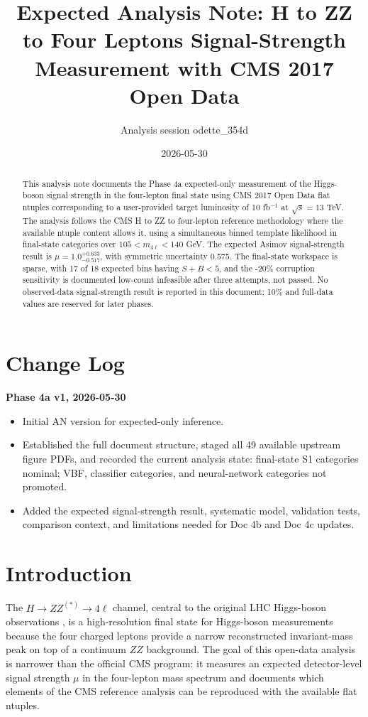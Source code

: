 \documentclass[11pt]{article}
\title{Expected Analysis Note: H to ZZ to Four Leptons Signal-Strength Measurement with CMS 2017 Open Data}
\author{Analysis session odette\_354d}
\date{2026-05-30}
\begin{document}
\maketitle
\begin{abstract}
This analysis note documents the Phase 4a expected-only measurement of the Higgs-boson signal strength in the four-lepton final state using CMS 2017 Open Data flat ntuples corresponding to a user-provided target luminosity of 10 fb$^{-1}$ at $\sqrt{s}=13$ TeV. The analysis follows the CMS H to ZZ to four-lepton reference methodology where the available ntuple content allows it, using a simultaneous binned template likelihood in final-state categories over $105 < m_{4\ell} < 140$ GeV. The expected Asimov signal-strength result is $\mu=1.0^{+0.633}_{-0.517}$, with symmetric uncertainty 0.575. The final-state workspace is sparse, with 17 of 18 expected bins having $S+B<5$, and the -20\% corruption sensitivity is documented low-count infeasible after three attempts, not passed. No observed-data signal-strength result is reported in this document; 10\% and full-data values are reserved for later phases.
\end{abstract}
\tableofcontents
\clearpage
\section*{Change Log}
\textbf{Phase 4a v1, 2026-05-30}
\begin{itemize}[leftmargin=*]
\item Initial AN version for expected-only inference.
\item Established the full document structure, staged all 49 available upstream figure PDFs, and recorded the current analysis state: final-state S1 categories nominal; VBF, classifier categories, and neural-network categories not promoted.
\item Added the expected signal-strength result, systematic model, validation tests, comparison context, and limitations needed for Doc 4b and Doc 4c updates.
\end{itemize}
\clearpage
\section{Introduction}
The $H\to ZZ^{(*)}\to4\ell$ channel, central to the original LHC Higgs-boson observations \cite{CMSDiscovery2012,ATLASDiscovery2012}, is a high-resolution final state for Higgs-boson measurements because the four charged leptons provide a narrow reconstructed invariant-mass peak on top of a continuum $ZZ$ background. The goal of this open-data analysis is narrower than the official CMS program: it measures an expected detector-level signal strength $\mu$ in the four-lepton mass spectrum and documents which elements of the CMS reference analysis can be reproduced with the available flat ntuples.
\end{document}

